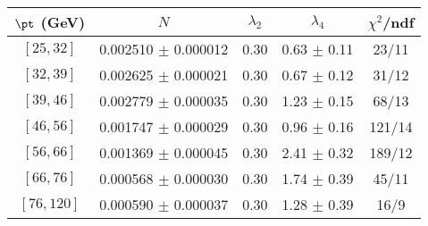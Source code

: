 \begin{tabular}{c||c|c|c|c}
$\pt$ (GeV) & $N$ & $\lambda_{2}$ & $\lambda_4$  & $\chi^2$/ndf  \\
\hline
$[25, 32]$ & 0.002510 $\pm$ 0.000012 & 0.30 & 0.63 $\pm$ 0.11 & 23/11\\
$[32, 39]$ & 0.002625 $\pm$ 0.000021 & 0.30 & 0.67 $\pm$ 0.12 & 31/12\\
$[39, 46]$ & 0.002779 $\pm$ 0.000035 & 0.30 & 1.23 $\pm$ 0.15 & 68/13\\
$[46, 56]$ & 0.001747 $\pm$ 0.000029 & 0.30 & 0.96 $\pm$ 0.16 & 121/14\\
$[56, 66]$ & 0.001369 $\pm$ 0.000045 & 0.30 & 2.41 $\pm$ 0.32 & 189/12\\
$[66, 76]$ & 0.000568 $\pm$ 0.000030 & 0.30 & 1.74 $\pm$ 0.39 & 45/11\\
$[76, 120]$ & 0.000590 $\pm$ 0.000037 & 0.30 & 1.28 $\pm$ 0.39 & 16/9\\
\end{tabular}
